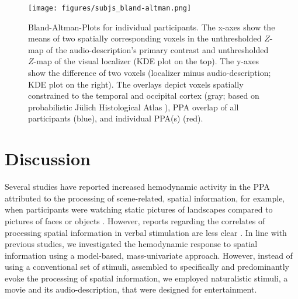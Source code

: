 \documentclass[english,11pt]{article}
\begin{document}
\begin{figure*}[tbp]
\centering
    \texttt{[image: figures/subjs\_bland-altman.png]}
    \caption{Bland-Altman-Plots for individual participants.
    The x-axes show the means of two spatially corresponding voxels in the
    unthresholded $Z$-map of the audio-description's primary contrast and
    unthresholded $Z$-map of the visual localizer (KDE plot on the top).
    The y-axes show the difference of two voxels (localizer minus
    audio-description; KDE plot on the right).
    The overlays depict voxels spatially constrained to the
    temporal and occipital cortex (gray; based on probabilistic Jülich
    Histological Atlas \citep{eickhoff2005toolbox, eickhoff2007assignment}),
    PPA overlap of all participants (blue),
    and individual PPA(s) (red).}
    \label{fig:bland-altman}
\end{figure*}


\section*{Discussion}




Several studies have reported increased hemodynamic activity in the PPA
attributed to the processing of scene-related, spatial information, for example,
when participants were watching static pictures of landscapes compared to
pictures of faces or objects \citep{epstein1998ppa, epstein1999parahippocampal}.
However, reports regarding the correlates of processing spatial information in
verbal stimulation are less clear \citep{aziz2008modulation}.
In line with previous studies, we investigated the hemodynamic response to
spatial information using a model-based, mass-univariate approach.
However, instead of using a conventional set of stimuli, assembled to
specifically and predominantly evoke the processing of spatial information, we
employed naturalistic stimuli, a movie and its audio-description, that were
designed for entertainment.
\end{document}
